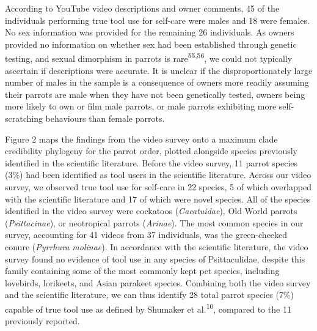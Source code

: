 \documentclass[
  man, donotrepeattitle,floatsintext]{apa6}
\begin{document}
According to YouTube video descriptions and owner comments,
45
of the individuals performing true tool use for self-care were males and
18
were females. No sex information was provided for the remaining
26
individuals. As owners provided no information on whether sex had been
established through genetic testing, and sexual dimorphism in parrots is
rare\textsuperscript{55,56}, we could not typically ascertain if descriptions
were accurate. It is unclear if the disproportionately large number of males in
the sample is a consequence of owners more readily assuming their parrots are
male when they have not been genetically tested, owners being more likely to own
or film male parrots, or male parrots exhibiting more self-scratching behaviours
than female parrots.

Figure 2 maps the findings from the video survey onto a
maximum clade credibility phylogeny for the parrot order, plotted alongside
species previously identified in the scientific literature. Before the video
survey, 11 parrot species (3\%) had been identified as tool users in the
scientific literature. Across our video survey, we observed true tool use for self-care in
22
species, 5 of which overlapped with the scientific literature and
17
of which were novel species. All of the species identified in the video survey
were cockatoos (\emph{Cacatuidae}), Old World parrots (\emph{Psittacinae}), or neotropical
parrots (\emph{Arinae}). The most common species in our survey, accounting for
41 videos from
37
individuals, was the green-cheeked conure (\emph{Pyrrhura molinae}). In accordance
with the scientific literature, the video survey found no evidence of tool use
in any species of Psittaculidae, despite this family containing some of the most
commonly kept pet species, including lovebirds, lorikeets, and Asian parakeet
species. Combining both the video survey and the scientific literature, we can
thus identify 28 total parrot species (7\%) capable of true tool use as defined
by Shumaker et al.\textsuperscript{10}, compared to the 11 previously reported.
\end{document}
